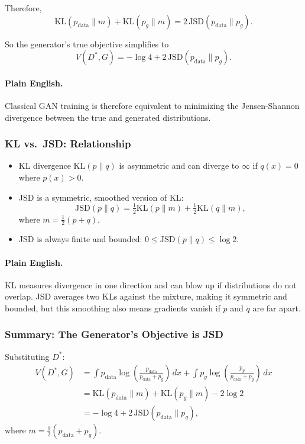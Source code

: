 \documentclass[11pt]{article}
\theoremstyle{remark}
\begin{document}
Therefore,
\begin{equation}
\mathrm{KL}(p_{\text{data}}\|m) + \mathrm{KL}(p_g\|m) = 2\,\mathrm{JSD}(p_{\text{data}}\|p_g).
\end{equation}

So the generator's true objective simplifies to
\begin{equation}
\boxed{V(D^*,G) = -\log 4 + 2\,\mathrm{JSD}(p_{\text{data}}\|p_g).}
\end{equation}

\paragraph{Plain English.}
Classical GAN training is therefore equivalent to minimizing the Jensen-Shannon divergence between the true and generated distributions.

\subsubsection{KL vs.\ JSD: Relationship}
\begin{itemize}
\item KL divergence $\mathrm{KL}(p\|q)$ is asymmetric and can diverge to $\infty$ if $q(x)=0$ where $p(x)>0$.
\item JSD is a symmetric, smoothed version of KL:
\[
\mathrm{JSD}(p\|q) = \tfrac{1}{2}\mathrm{KL}(p\|m)+\tfrac{1}{2}\mathrm{KL}(q\|m),
\]
where $m=\tfrac12(p+q)$.
\item JSD is always finite and bounded: $0 \le \mathrm{JSD}(p\|q) \le \log 2$.
\end{itemize}

\paragraph{Plain English.}
KL measures divergence in one direction and can blow up if distributions do not overlap. JSD averages two KLs against the mixture, making it symmetric and bounded, but this smoothing also means gradients vanish if $p$ and $q$ are far apart.

\subsubsection{Summary: The Generator's Objective is JSD}
Substituting $D^*$:
\begin{align}
V(D^*,G)
&=\int p_{\text{data}}\log\!\left(\frac{p_{\text{data}}}{p_{\text{data}}+p_g}\right)\,dx
+\int p_g\log\!\left(\frac{p_g}{p_{\text{data}}+p_g}\right)\,dx\\
&=\mathrm{KL}(p_{\text{data}}\|m)+\mathrm{KL}(p_g\|m)-2\log 2\\
&=-\log 4 + 2\,\mathrm{JSD}(p_{\text{data}}\|p_g),
\end{align}
where $m=\tfrac12(p_{\text{data}}+p_g)$.
\end{document}
